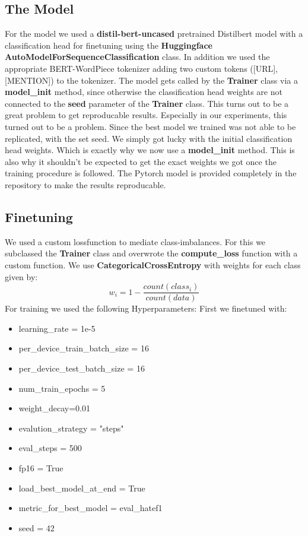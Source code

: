 \documentclass[11pt,a4paper]{article}
\begin{document}
\subsection{The Model}
For the model we used a \textbf{distil-bert-uncased} pretrained Distilbert model with a classification head for finetuning
using the \textbf{Huggingface} \cite{Huggingface} \textbf{AutoModelForSequenceClassification} class. In addition we used the appropriate BERT-WordPiece 
tokenizer adding two custom tokens ([URL],[MENTION]) to the tokenizer.
The model gets called by the \textbf{Trainer} class via a \textbf{model\_init} method, since otherwise the classification head
weights are not connected to the \textbf{seed} parameter of the \textbf{Trainer} class.
This turns out to be a great problem to get reproducable results.
Especially in our experiments, this turned out to be a problem. 
Since the best model we trained was not able to be replicated,
with the set seed. We simply got lucky with the initial classification head weights.
Which is exactly why we now use a \textbf{model\_init} method.
This is also why it shouldn't be expected to get the exact weights we got once the training procedure is followed.
The Pytorch model is provided completely in the repository to make the results reproducable.

\subsection{Finetuning}
We used a custom lossfunction to mediate class-imbalances.
For this we subclassed the \textbf{Trainer} class and overwrote the \textbf{compute\_loss} function with a custom function.
We use \textbf{CategoricalCrossEntropy} with weights for each class given by:
$$ w_i = 1 - \frac{count(class_i)}{count(data)}$$
For training we used the following Hyperparameters:
First we finetuned with: 
\begin{itemize}
    \setlength{\itemsep}{0.5pt}
    \item learning\_rate = 1e-5
    \item per\_device\_train\_batch\_size = 16
    \item per\_device\_test\_batch\_size = 16
    \item num\_train\_epochs = 5
    \item weight\_decay=0.01
    \item evalution\_strategy = "steps"
    \item eval\_steps = 500
    \item fp16 = True
    \item load\_best\_model\_at\_end = True
    \item metric\_for\_best\_model = eval\_hatef1
    \item seed = 42
\end{itemize}
\end{document}
